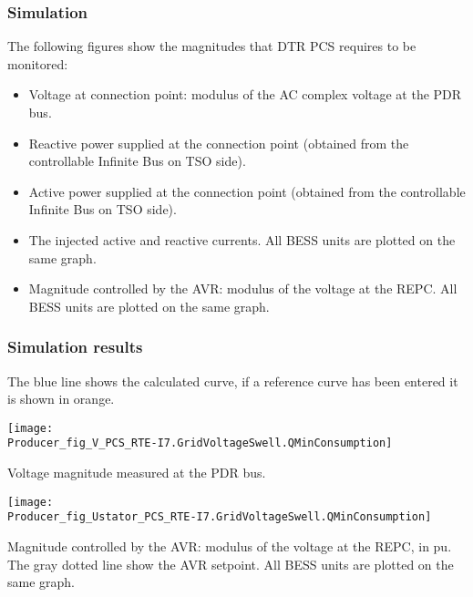     \subsubsection{Simulation}
    The following figures show the magnitudes that DTR PCS \DTRPcs
    requires to be monitored:
    \begin{itemize}
        \item Voltage at connection point: modulus of the AC complex voltage at
        the PDR bus.
        \item Reactive power supplied at the connection point (obtained from
        the controllable Infinite Bus on TSO side).
        \item Active power supplied at the connection point (obtained from
        the controllable Infinite Bus on TSO side).
        \item The injected active and reactive currents. All BESS
        units are plotted on the same graph.
        \item Magnitude controlled by the AVR: modulus of the voltage at the REPC.
        All BESS units are plotted on the same graph.
    \end{itemize}

    \subsubsection{Simulation results}
    The blue line shows the calculated curve, if a reference curve has been entered it is
    shown in orange.

    \noindent
    \begin{minipage}[t]{0.48\textwidth}
        \centering
        \texttt{[image: \\Producer\_fig\_V\_PCS\_RTE-I7.GridVoltageSwell.QMinConsumption]}
        \begin{minipage}[t]{0.8\textwidth}
            \small Voltage magnitude measured at the PDR bus.
        \end{minipage}
    \end{minipage}
    \hfill
        \begin{minipage}[t]{0.48\textwidth}
            \centering
            \texttt{[image: \\Producer\_fig\_Ustator\_PCS\_RTE-I7.GridVoltageSwell.QMinConsumption]}
            \begin{minipage}[t]{0.8\textwidth}
                \small Magnitude controlled by the AVR: modulus of the voltage at the REPC, in pu.
                The gray dotted line show the AVR setpoint. All BESS units are plotted on the same
                graph.
            \end{minipage}
        \end{minipage}

